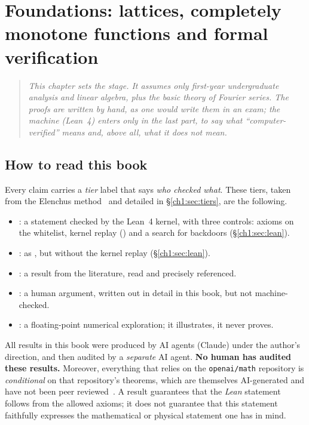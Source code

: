 \chapter{Foundations: lattices, completely monotone functions and formal verification}
\label{ch1:chap}

\begin{quote}\small\itshape
This chapter sets the stage. It assumes only first-year undergraduate analysis and linear algebra,
plus the basic theory of Fourier series. The proofs are written by hand, as one would write them in an exam;
the machine (Lean~4) enters only in the last part, to say what ``computer-verified'' means and, above all,
what it does not mean.
\end{quote}

\section*{How to read this book}

Every claim carries a \emph{tier} label that says \emph{who checked what}.
These tiers, taken from the Elenchus method~\cite{elenchus} and detailed in §\ref{ch1:sec:tiers}, are the following.
\begin{itemize}
\item \tierA{}: a statement checked by the Lean~4 kernel, with three controls: axioms on the whitelist, kernel replay () and a search for backdoors (§\ref{ch1:sec:lean}).
\item \tierAs{}: as \tierA{}, but without the kernel replay (§\ref{ch1:sec:lean}).
\item \tierL{}: a result from the literature, read and precisely referenced.
\item \tierC{}: a human argument, written out in detail in this book, but not machine-checked.
\item \tierX{}: a floating-point numerical exploration; it illustrates, it never proves.
\end{itemize}

\begin{warnbox}
All results in this book were produced by AI agents (Claude) under the author's direction, and then audited
by a \emph{separate} AI agent. \textbf{No human has audited these results.} Moreover, everything that relies on the
\texttt{openai/math} repository is \emph{conditional} on that repository's theorems, which are themselves AI-generated and have not been
peer reviewed~\cite{oai}. A \tierA{} result guarantees that the \emph{Lean} statement follows from the
allowed axioms; it does not guarantee that this statement faithfully expresses the mathematical or physical statement one has in mind.
\end{warnbox}

